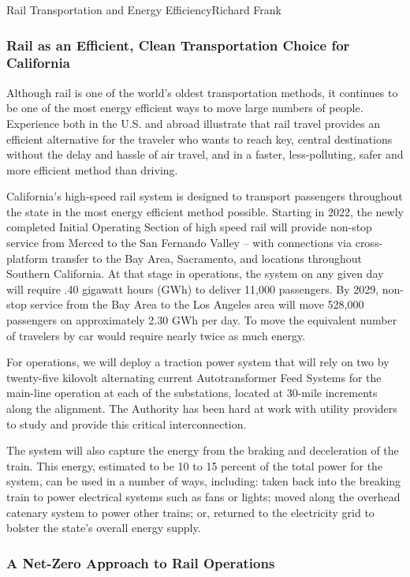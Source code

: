 \documentclass{papertex}
\begin{document}
\begin{news}{2}{Rail Transportation and Energy Efficiency}{Richard Frank}{}{}
\subsubsection*{Rail as an Efficient, Clean Transportation Choice for
    California}

Although rail is one of the world’s oldest transportation methods, it continues 
to be one of the most energy efficient ways to move large numbers of people. 
Experience both in the U.S. and abroad illustrate that rail travel provides an 
efficient alternative for the traveler who wants to reach key, central 
destinations without the delay and hassle of air travel, and in a faster, 
less-polluting, safer and more efficient method than driving.

California’s high-speed rail system is designed to transport passengers 
throughout the state in the most energy efficient method possible. Starting in 
2022, the newly completed Initial Operating Section of high speed rail will 
provide non-stop service from Merced to the San Fernando Valley – with 
connections via cross-platform transfer to the Bay Area, Sacramento, and 
locations throughout Southern California. At that stage in operations, the 
system on any given day will require .40 gigawatt hours (GWh) to deliver 
11,000 passengers.  By 2029, non-stop service from the Bay Area to the Los 
Angeles area will move 528,000 passengers on approximately 2.30 GWh per day. 
To move the equivalent number of travelers by car would require nearly twice 
as much energy.

For operations, we will deploy a traction power system that will rely on two 
by twenty-five kilovolt alternating current Autotransformer Feed Systems for 
the main-line operation at each of the substations, located at 30-mile 
increments along the alignment.  The Authority has been hard at work with 
utility providers to study and provide this critical interconnection.

The system will also capture the energy from the braking and deceleration of 
the train. This energy, estimated to be 10 to 15 percent of the total power 
for the system, can be used in a number of ways, including: taken back into 
the breaking train to power electrical systems such as fans or lights; moved 
along the overhead catenary system to power other trains; or, returned to the 
electricity grid to bolster the state’s overall energy supply.

\subsubsection*{A Net-Zero Approach to Rail Operations}


\end{news}
\end{document}
